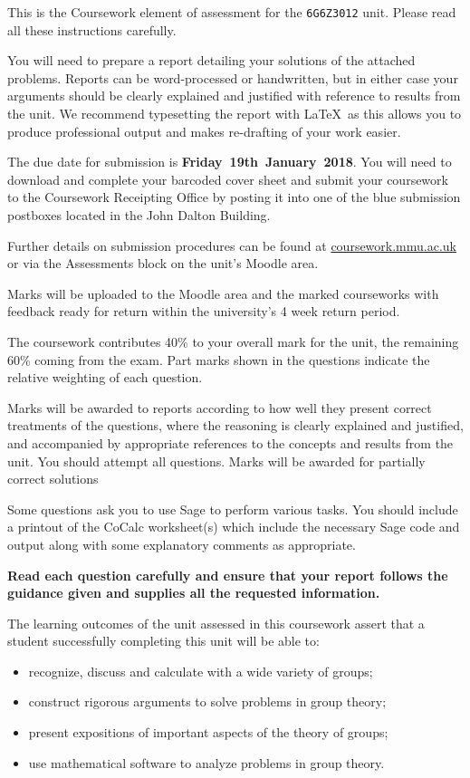 \documentclass[oneside,10pt]{amsart}
\newcommand{\logo}{\marginpar{\vskip -1mm \texttt{[image: mmulogo.png]}}}
\begin{document}
{}

This is the Coursework element of assessment for the \texttt{6G6Z3012} unit. Please read all these instructions carefully.

You will need to prepare a report detailing your solutions of the attached problems. Reports can be word-processed or handwritten, but in either case your arguments should be clearly explained and justified with reference to results from the unit. We recommend typesetting the report with \LaTeX\ as this allows you to produce professional output and makes re-drafting of your work easier.

The due date for submission is {\bfseries Friday~19th~January~2018}. You will need to download and complete your barcoded cover sheet and submit your coursework to the Coursework Receipting Office by posting it into one of the blue submission postboxes located in the John Dalton Building.

Further details on submission procedures can be found at \url{coursework.mmu.ac.uk} or via the Assessments block on the unit's Moodle area.

Marks will be uploaded to the Moodle area and the marked courseworks with feedback ready for return within the university's 4 week return period.

The coursework contributes 40\% to your overall mark for the unit, the remaining 60\% coming from the exam. Part marks shown in the questions indicate the relative weighting of each question.

Marks will be awarded to reports according to how well they present correct treatments of the questions, where the reasoning is clearly explained and justified, and accompanied by appropriate references to the concepts and results from the unit. You should attempt all questions. Marks will be awarded for partially correct solutions

Some questions ask you to use Sage to perform various tasks. You should include a printout of the CoCalc worksheet(s) which include the necessary Sage code and output along with some explanatory comments as appropriate.

\textbf{Read each question carefully and ensure that your report follows the guidance given and supplies all the requested information.}

The learning outcomes of the unit assessed in this coursework assert that a student successfully completing this unit will be able to:
\begin{itemize}
\item
recognize, discuss and calculate with a wide variety of groups;
\item
construct rigorous arguments to solve problems in group theory;
\item
present expositions of important aspects of the theory of groups;
\item
use mathematical software to analyze problems in group theory.
\end{itemize}
\end{document}

